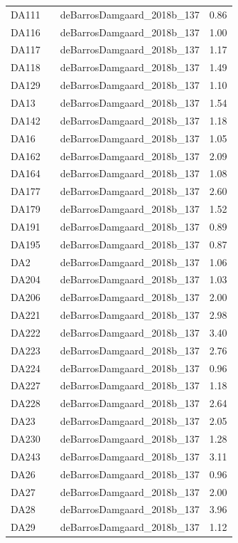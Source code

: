\begin{longtable}[t]{lllr}
DA111 &  & deBarrosDamgaard\_2018b\_137 & 0.86\\
DA116 &  & deBarrosDamgaard\_2018b\_137 & 1.00\\
DA117 &  & deBarrosDamgaard\_2018b\_137 & 1.17\\
DA118 &  & deBarrosDamgaard\_2018b\_137 & 1.49\\
DA129 &  & deBarrosDamgaard\_2018b\_137 & 1.10\\
DA13 &  & deBarrosDamgaard\_2018b\_137 & 1.54\\
DA142 &  & deBarrosDamgaard\_2018b\_137 & 1.18\\
DA16 &  & deBarrosDamgaard\_2018b\_137 & 1.05\\
DA162 &  & deBarrosDamgaard\_2018b\_137 & 2.09\\
DA164 &  & deBarrosDamgaard\_2018b\_137 & 1.08\\
DA177 &  & deBarrosDamgaard\_2018b\_137 & 2.60\\
DA179 &  & deBarrosDamgaard\_2018b\_137 & 1.52\\
DA191 &  & deBarrosDamgaard\_2018b\_137 & 0.89\\
DA195 &  & deBarrosDamgaard\_2018b\_137 & 0.87\\
DA2 &  & deBarrosDamgaard\_2018b\_137 & 1.06\\
DA204 &  & deBarrosDamgaard\_2018b\_137 & 1.03\\
DA206 &  & deBarrosDamgaard\_2018b\_137 & 2.00\\
DA221 &  & deBarrosDamgaard\_2018b\_137 & 2.98\\
DA222 &  & deBarrosDamgaard\_2018b\_137 & 3.40\\
DA223 &  & deBarrosDamgaard\_2018b\_137 & 2.76\\
DA224 &  & deBarrosDamgaard\_2018b\_137 & 0.96\\
DA227 &  & deBarrosDamgaard\_2018b\_137 & 1.18\\
DA228 &  & deBarrosDamgaard\_2018b\_137 & 2.64\\
DA23 &  & deBarrosDamgaard\_2018b\_137 & 2.05\\
DA230 &  & deBarrosDamgaard\_2018b\_137 & 1.28\\
DA243 &  & deBarrosDamgaard\_2018b\_137 & 3.11\\
DA26 &  & deBarrosDamgaard\_2018b\_137 & 0.96\\
DA27 &  & deBarrosDamgaard\_2018b\_137 & 2.00\\
DA28 &  & deBarrosDamgaard\_2018b\_137 & 3.96\\
DA29 &  & deBarrosDamgaard\_2018b\_137 & 1.12\\

\end{longtable}
